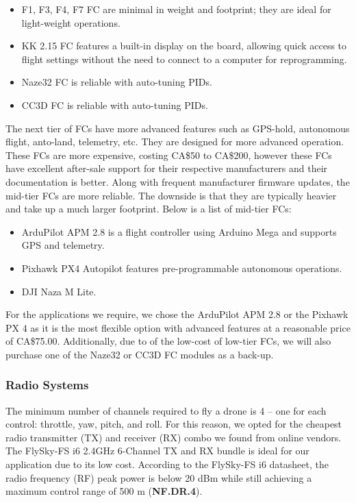 \begin{itemize}[noitemsep,topsep=0pt, parsep=4pt, partopsep=0pt]
    \item F1, F3, F4, F7 FC are minimal in weight and footprint; they are ideal for light-weight operations.\cite{f1fc}
    \item KK 2.15 FC features a built-in display on the board, allowing quick access to flight settings without the need to connect to a computer for reprogramming.
    \item Naze32 FC is reliable with auto-tuning PIDs.
    \item CC3D FC is reliable with auto-tuning PIDs.
\end{itemize}

The next tier of FCs have more advanced features such as GPS-hold, autonomous flight, anto-land, telemetry, etc. They are designed for more advanced operation. These FCs are more expensive, costing CA\$50 to CA\$200, however these FCs have excellent after-sale support for their respective 
manufacturers and their documentation is better. Along 
with frequent manufacturer firmware updates, the mid-tier FCs are more reliable. The downside is that 
they are typically heavier and take up a much larger footprint. 
Below is a list of mid-tier FCs:

\begin{itemize}[noitemsep,topsep=0pt, parsep=4pt, partopsep=0pt]
    \item ArduPilot APM 2.8 is a flight controller using Arduino Mega and supports GPS and telemetry.
    \item Pixhawk PX4 Autopilot features pre-programmable autonomous operations.
    \item DJI Naza M Lite.
\end{itemize}

For the applications we require, we chose the ArduPilot APM 2.8 or the Pixhawk PX 4 as it is the most flexible option with advanced features at a reasonable price of CA\$75.00. Additionally, due to of the low-cost of low-tier FCs, we will also purchase one of the Naze32 or CC3D FC modules as a back-up.

\subsubsection{Radio Systems}

The minimum number of channels required to fly a drone is 4 -- one for each control: throttle, yaw, 
pitch, and roll. For this reason, we opted for the cheapest radio transmitter (TX) and receiver  (RX) 
combo we found from online vendors. 
The FlySky-FS i6 2.4GHz 6-Channel TX and RX bundle is ideal for our application due to its low cost.
According to the FlySky-FS i6 datasheet\cite{flyskyi6}, the radio frequency (RF) peak power is below 20 dBm while still achieving a maximum control range of 500 m (\textbf{NF.DR.4}).

